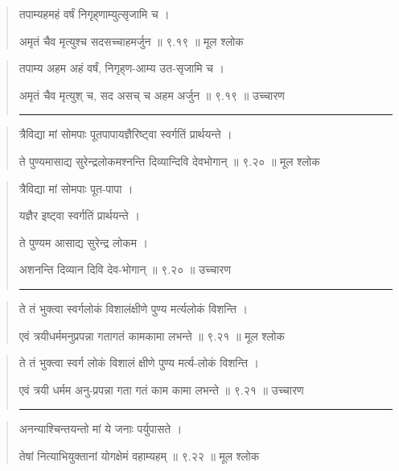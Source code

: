 \begin{quotation} 

तपाम्यहमहं वर्षं निगृह्‌णाम्युत्सृजामि च  ।  

अमृतं चैव मृत्युश्च सदसच्चाहमर्जुन  ॥ ९.१९ ॥  मूल श्लोक
\end{quotation}

\begin{quotation}

तपाम्य अहम अहं वर्षं, निगृह्‌ण-आम्य उत-सृजामि च  ।  

अमृतं चैव मृत्युश् च, सद असच् च अहम अर्जुन  ॥ ९.१९ ॥  उच्चारण

\noindent\rule{16cm}{0.4pt} 
\end{quotation}


\begin{quotation} 

त्रैविद्या मां सोमपाः पूतपापायज्ञैरिष्ट्‍वा स्वर्गतिं प्रार्थयन्ते ।  

ते पुण्यमासाद्य सुरेन्द्रलोकमश्नन्ति दिव्यान्दिवि देवभोगान्‌  ॥ ९.२० ॥  मूल श्लोक
\end{quotation}

\begin{quotation}

त्रैविद्या मां सोमपाः पूत-पापा ।  

यज्ञैर इष्ट्‍वा स्वर्गतिं प्रार्थयन्ते ।  

ते पुण्यम आसाद्य सुरेन्द्र लोकम ।  

अशनन्ति दिव्यान दिवि देव-भोगान्‌  ॥ ९.२० ॥  उच्चारण

\noindent\rule{16cm}{0.4pt} 
\end{quotation}


\begin{quotation} 

ते तं भुक्त्वा स्वर्गलोकं विशालंक्षीणे पुण्य मर्त्यलोकं विशन्ति ।  

एवं त्रयीधर्ममनुप्रपन्ना गतागतं कामकामा लभन्ते  ॥ ९.२१ ॥  मूल श्लोक
\end{quotation}

\begin{quotation}

ते तं भुक्त्वा स्वर्ग लोकं विशालं
क्षीणे पुण्य मर्त्य-लोकं विशन्ति ।  

एवं त्रयी धर्मम अनु-प्रपन्ना 
गता गतं काम कामा लभन्ते  ॥ ९.२१ ॥  उच्चारण

\noindent\rule{16cm}{0.4pt} 
\end{quotation}


\begin{quotation} 

अनन्याश्चिन्तयन्तो मां ये जनाः पर्युपासते  ।  

तेषां नित्याभियुक्तानां योगक्षेमं वहाम्यहम्‌  ॥ ९.२२ ॥  मूल श्लोक
\end{quotation}

